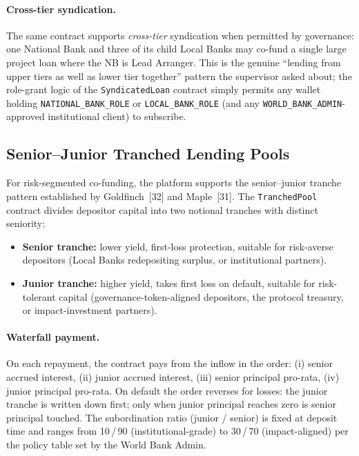 \documentclass[12pt,a4paper]{report}
\begin{document}
\paragraph{Cross-tier syndication.}
The same contract supports \emph{cross-tier} syndication when permitted by governance: one National Bank and three of its child Local Banks may co-fund a single large project loan where the NB is Lead Arranger. This is the genuine ``lending from upper tiers as well as lower tier together'' pattern the supervisor asked about; the role-grant logic of the \texttt{SyndicatedLoan} contract simply permits any wallet holding \texttt{NATIONAL\_BANK\_ROLE} or \texttt{LOCAL\_BANK\_ROLE} (and any \texttt{WORLD\_BANK\_ADMIN}-approved institutional client) to subscribe.

\subsection{Senior--Junior Tranched Lending Pools}
\label{sec:tranched-pools}

For risk-segmented co-funding, the platform supports the senior--junior tranche pattern established by Goldfinch~[32] and Maple~[31]. The \texttt{TranchedPool} contract divides depositor capital into two notional tranches with distinct seniority:

\begin{itemize}[noitemsep]
\item \textbf{Senior tranche:} lower yield, first-loss protection, suitable for risk-averse depositors (Local Banks redepositing surplus, or institutional partners).
\item \textbf{Junior tranche:} higher yield, takes first loss on default, suitable for risk-tolerant capital (governance-token-aligned depositors, the protocol treasury, or impact-investment partners).
\end{itemize}

\paragraph{Waterfall payment.}
On each repayment, the contract pays from the inflow in the order: (i) senior accrued interest, (ii) junior accrued interest, (iii) senior principal pro-rata, (iv) junior principal pro-rata. On default the order reverses for losses: the junior tranche is written down first; only when junior principal reaches zero is senior principal touched. The subordination ratio (junior / senior) is fixed at deposit time and ranges from 10\,/\,90 (institutional-grade) to 30\,/\,70 (impact-aligned) per the policy table set by the World Bank Admin.
\end{document}
